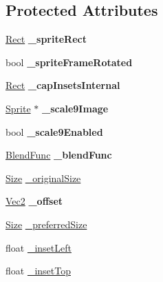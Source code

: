\subsection*{Protected Attributes}
\begin{DoxyCompactItemize}
\item 
\mbox{\label{classui_1_1Scale9Sprite_a3be2293a333b2e7a9e68280140b44f6e}} 
\hyperlink{classRect}{Rect} {\bfseries \+\_\+sprite\+Rect}
\item 
\mbox{\label{classui_1_1Scale9Sprite_ac542795c2bbaf107810daeeb185a4c96}} 
bool {\bfseries \+\_\+sprite\+Frame\+Rotated}
\item 
\mbox{\label{classui_1_1Scale9Sprite_a7f6594fe8ea3b93a7072aa65a82c98e6}} 
\hyperlink{classRect}{Rect} {\bfseries \+\_\+cap\+Insets\+Internal}
\item 
\mbox{\label{classui_1_1Scale9Sprite_a315f205681125d1fae6a3b0ff9aec870}} 
\hyperlink{classSprite}{Sprite} $\ast$ {\bfseries \+\_\+scale9\+Image}
\item 
\mbox{\label{classui_1_1Scale9Sprite_ae2b01034d2a92dd71bce58449095e8e6}} 
bool {\bfseries \+\_\+scale9\+Enabled}
\item 
\mbox{\label{classui_1_1Scale9Sprite_a5753a329a26f2ef2c84976aae23f74c8}} 
\hyperlink{structBlendFunc}{Blend\+Func} {\bfseries \+\_\+blend\+Func}
\item 
\hyperlink{classSize}{Size} \hyperlink{classui_1_1Scale9Sprite_a6cc9bf3f37d996b7ff39063dc8802901}{\+\_\+original\+Size}
\item 
\mbox{\label{classui_1_1Scale9Sprite_a9d584950bed74659b012332823e90761}} 
\hyperlink{classVec2}{Vec2} {\bfseries \+\_\+offset}
\item 
\hyperlink{classSize}{Size} \hyperlink{classui_1_1Scale9Sprite_a4d2086f5341386fdddcdd410bd8a5481}{\+\_\+preferred\+Size}
\item 
float \hyperlink{classui_1_1Scale9Sprite_ac26642228949c054463891a11739bf24}{\+\_\+inset\+Left}
\item 
float \hyperlink{classui_1_1Scale9Sprite_a2e2d558c8ae6703bcad9b94cd55add00}{\+\_\+inset\+Top}

\end{DoxyCompactItemize}
